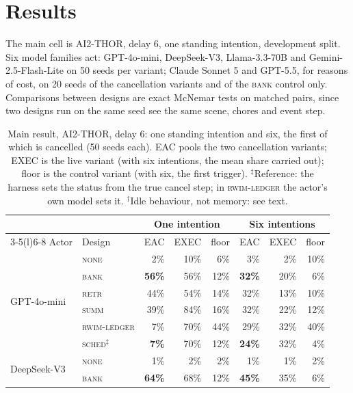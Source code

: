 \section{Results}
\label{sec:results}

The main cell is AI2-THOR, delay 6, one standing intention, development
split. Six model families act: GPT-4o-mini, DeepSeek-V3, Llama-3.3-70B and
Gemini-2.5-Flash-Lite on 50 seeds per variant; Claude Sonnet 5 and GPT-5.5,
for reasons of cost, on 20 seeds of the cancellation variants and of the
\textsc{bank} control only. Comparisons between designs are exact McNemar
tests on matched pairs, since two designs run on the same seed see the same
scene, chores and event step.

\begin{table}[t]
\caption{Main result, AI2-THOR, delay 6: one standing intention and six,
the first of which is cancelled (50 seeds each). EAC pools the two
cancellation variants; EXEC is the live variant (with six intentions, the
mean share carried out); floor is the control variant (with six, the
first trigger). $^\ddagger$Reference: the harness sets the status from the
true cancel step; in \textsc{rwim-ledger} the actor's own model sets it.
$^\dagger$Idle behaviour, not memory: see text.}
\label{tab:main}
\footnotesize
\setlength{\tabcolsep}{3pt}
\renewcommand{\arraystretch}{0.93}
\begin{tabular}{@{}llrrrrrr@{}}
\toprule
 & & \multicolumn{3}{c}{One intention} & \multicolumn{3}{c}{Six intentions} \\
\cmidrule(lr){3-5}\cmidrule(l){6-8}
Actor & Design & EAC & EXEC & floor & EAC & EXEC & floor \\
\midrule
\multirow{6}{*}{GPT-4o-mini}
 & \textsc{none}   & 2\%  & 10\% & 6\% & 3\% & 2\% & 10\% \\
 & \textsc{bank}   & \textbf{56\%} & 56\% & 12\% & \textbf{32\%} & 20\% & 6\% \\
 & \textsc{retr}   & 44\% & 54\% & 14\% & 32\% & 13\% & 10\% \\
 & \textsc{summ}   & 39\% & 84\% & 16\% & 32\% & 22\% & 12\% \\
 & \textsc{rwim-ledger} & 7\% & 70\% & 44\% & 29\% & 32\% & 40\% \\
 & \textsc{sched}$^\ddagger$ & \textbf{7\%}  & 70\% & 12\% & \textbf{24\%} & 32\% & 4\% \\
\midrule
\multirow{6}{*}{DeepSeek-V3}
 & \textsc{none}   & 1\%  & 2\%  & 2\% & 1\% & 1\% & 2\% \\
 & \textsc{bank}   & \textbf{64\%} & 68\% & 12\% & \textbf{45\%} & 35\% & 6\% \\

\end{tabular}
\end{table}
